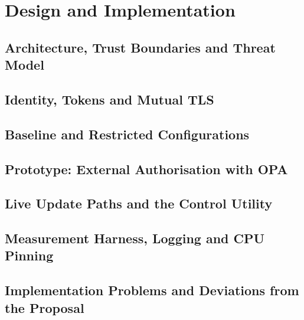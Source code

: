 \chapter{Design and Implementation}\label{ch:design}
\section{Architecture, Trust Boundaries and Threat Model}
\section{Identity, Tokens and Mutual TLS}
\section{Baseline and Restricted Configurations}
\section{Prototype: External Authorisation with OPA}
\section{Live Update Paths and the Control Utility}
\section{Measurement Harness, Logging and CPU Pinning}
\section{Implementation Problems and Deviations from the Proposal}
